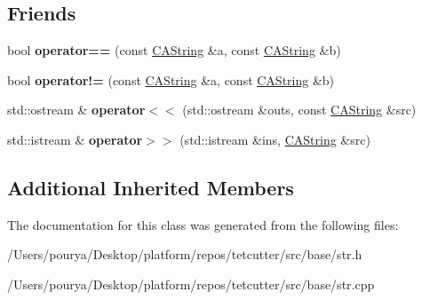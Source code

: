 \subsection*{Friends}
\begin{DoxyCompactItemize}
\item 
\hypertarget{classps_1_1base_1_1CAString_af08d599a65a50bd5131168bc28ae3d79}{}bool {\bfseries operator==} (const \hyperlink{classps_1_1base_1_1CAString}{C\+A\+String} \&a, const \hyperlink{classps_1_1base_1_1CAString}{C\+A\+String} \&b)\label{classps_1_1base_1_1CAString_af08d599a65a50bd5131168bc28ae3d79}

\item 
\hypertarget{classps_1_1base_1_1CAString_aecfb2f974e22bd9e714731540f485fb1}{}bool {\bfseries operator!=} (const \hyperlink{classps_1_1base_1_1CAString}{C\+A\+String} \&a, const \hyperlink{classps_1_1base_1_1CAString}{C\+A\+String} \&b)\label{classps_1_1base_1_1CAString_aecfb2f974e22bd9e714731540f485fb1}

\item 
\hypertarget{classps_1_1base_1_1CAString_a62956ad2e84aaeb16a98f858b0f47c04}{}std\+::ostream \& {\bfseries operator$<$$<$} (std\+::ostream \&outs, const \hyperlink{classps_1_1base_1_1CAString}{C\+A\+String} \&src)\label{classps_1_1base_1_1CAString_a62956ad2e84aaeb16a98f858b0f47c04}

\item 
\hypertarget{classps_1_1base_1_1CAString_ac6302a1ff70b302727ac650d67e53c96}{}std\+::istream \& {\bfseries operator$>$$>$} (std\+::istream \&ins, \hyperlink{classps_1_1base_1_1CAString}{C\+A\+String} \&src)\label{classps_1_1base_1_1CAString_ac6302a1ff70b302727ac650d67e53c96}

\end{DoxyCompactItemize}
\subsection*{Additional Inherited Members}


The documentation for this class was generated from the following files\+:\begin{DoxyCompactItemize}
\item 
/\+Users/pourya/\+Desktop/platform/repos/tetcutter/src/base/str.\+h\item 
/\+Users/pourya/\+Desktop/platform/repos/tetcutter/src/base/str.\+cpp\end{DoxyCompactItemize}

